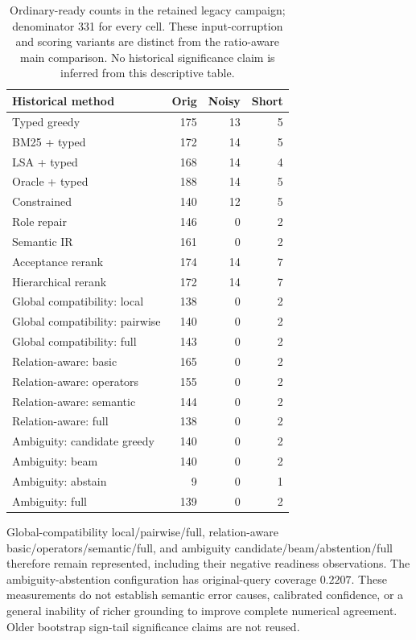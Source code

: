 \begin{table}[htbp]\centering\small
\caption{Ordinary-ready counts in the retained legacy campaign; denominator 331 for every cell. These input-corruption and scoring variants are distinct from the ratio-aware main comparison. No historical significance claim is inferred from this descriptive table.}\label{tab:legacy-grounding}
\begin{tabular}{@{}lrrr@{}}\toprule
Historical method & Orig & Noisy & Short\\\midrule
Typed greedy & 175 & 13 & 5\\
BM25 + typed & 172 & 14 & 5\\
LSA + typed & 168 & 14 & 4\\
Oracle + typed & 188 & 14 & 5\\
Constrained & 140 & 12 & 5\\
Role repair & 146 & 0 & 2\\
Semantic IR & 161 & 0 & 2\\
Acceptance rerank & 174 & 14 & 7\\
Hierarchical rerank & 172 & 14 & 7\\
Global compatibility: local & 138 & 0 & 2\\
Global compatibility: pairwise & 140 & 0 & 2\\
Global compatibility: full & 143 & 0 & 2\\
Relation-aware: basic & 165 & 0 & 2\\
Relation-aware: operators & 155 & 0 & 2\\
Relation-aware: semantic & 144 & 0 & 2\\
Relation-aware: full & 138 & 0 & 2\\
Ambiguity: candidate greedy & 140 & 0 & 2\\
Ambiguity: beam & 140 & 0 & 2\\
Ambiguity: abstain & 9 & 0 & 1\\
Ambiguity: full & 139 & 0 & 2\\
\bottomrule\end{tabular}\end{table}
Global-compatibility local/pairwise/full, relation-aware basic/operators/semantic/full, and ambiguity candidate/beam/abstention/full therefore remain represented, including their negative readiness observations. The ambiguity-abstention configuration has original-query coverage $0.2207$. These measurements do not establish semantic error causes, calibrated confidence, or a general inability of richer grounding to improve complete numerical agreement. Older bootstrap sign-tail significance claims are not reused.

